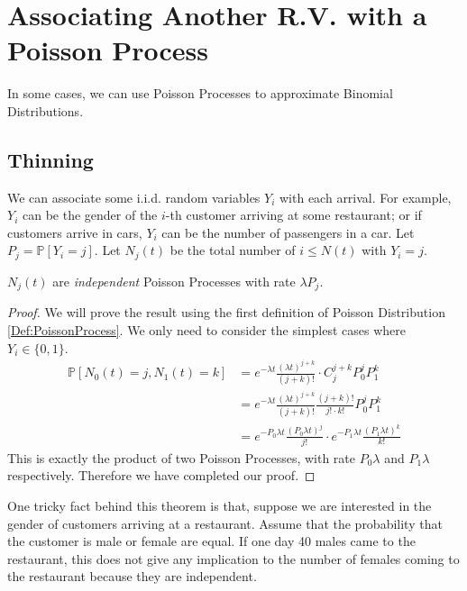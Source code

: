 \section{Associating Another R.V. with a Poisson Process}
    In some cases, we can use Poisson Processes to approximate Binomial Distributions.

    \subsection{Thinning}
        We can associate some i.i.d. random variables $Y_i$ with each arrival. For example, $Y_i$ can be the gender of the $i$-th customer arriving at some restaurant; or if customers arrive in cars, $Y_i$ can be the number of passengers in a car. Let $P_j = \mathbb{P}[Y_i = j]$. Let $N_j(t)$ be the total number of $i \le N(t)$ with $Y_i = j$.

        \begin{theorem}\label{Thm:ThinningOfPoissonProcess}
            $N_j(t)$ are \emph{independent} Poisson Processes with rate $\lambda P_j$.
        \end{theorem}
        \begin{proof}
            We will prove the result using the first definition of Poisson Distribution \ref{Def:PoissonProcess}. We only need to consider the simplest cases where $Y_i \in \{0,1\}$.
            \begin{align*}
                \mathbb{P}[N_0(t) = j, N_1(t) = k] &= e^{-\lambda t}\frac{(\lambda t)^{j+k}}{(j+k)!}\cdot C^{j+k}_j P_0^j P_1^k \\
                &= e^{-\lambda t}\frac{(\lambda t)^{j+k}}{(j+k)!}\frac{(j+k)!}{j! \cdot k!}P_0^j P_1^k\\
                &= e^{-P_0\lambda t}\frac{(P_0\lambda t)^j}{j!} \cdot e^{-P_1\lambda t} \frac{(P_1 \lambda t)^k}{k!}
            \end{align*}
            This is exactly the product of two Poisson Processes, with rate $P_0\lambda$ and $P_1\lambda$ respectively. Therefore we have completed our proof.
        \end{proof}
        \begin{remark}
            One tricky fact behind this theorem is that, suppose we are interested in the gender of customers arriving at a restaurant. Assume that the probability that the customer is male or female are equal. If one day 40 males came to the restaurant, this does not give any implication to the number of females coming to the restaurant because they are independent.
        \end{remark}

